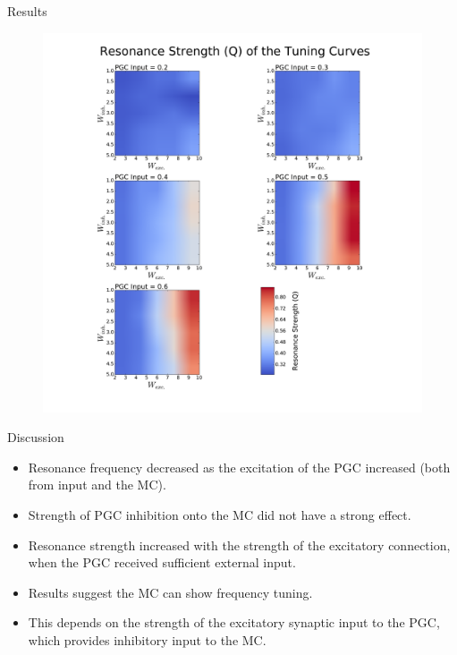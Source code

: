 \documentclass[final,hyperref={pdfpagelabels=false}]{beamer}
\begin{document}
\begin{frame}{}
\begin{columns}[t]
\begin{column}{.48\linewidth}
\begin{block}{Results}
\begin{figure}
\includegraphics[scale=0.55]{images/Contour_plot_tuning_strength}
\end{figure} 
\end{block}

\begin{block}{Discussion}
\begin{itemize}
\item Resonance frequency decreased as the excitation of the PGC increased (both from input and the MC).
\item Strength of PGC inhibition onto the MC did not have a strong effect.
\item Resonance strength increased with the strength of the excitatory connection, when the PGC received sufficient external input.
\item Results suggest the MC can show frequency tuning.
\item This depends on the strength of the excitatory synaptic input to the PGC, which provides inhibitory input to the MC.
\end{itemize}
\end{block}

\end{column}
\end{columns}
\end{frame}
\end{document}
